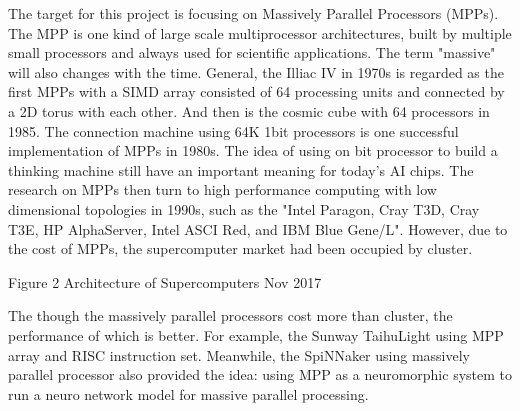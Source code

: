 \par The target for this project is focusing on Massively Parallel Processors (MPPs). The MPP is one kind of large scale multiprocessor architectures, built by multiple small processors and always used for scientific applications.\cite{hennessy2017computer} The term "massive" will also changes with the time. General, the Illiac IV in 1970s is regarded as the first MPPs with a SIMD array consisted of 64 processing units and connected by a 2D torus with each other\cite{hennessy2017computer}. And then is the cosmic cube\cite{seitz1985cosmic} with 64 processors in 1985. The connection machine\cite{Hillis1985The}\cite{leiserson1992network} using 64K 1bit processors is one successful implementation of MPPs in 1980s. The idea of using on bit processor to build a thinking machine still have an important meaning for today's AI chips. The research on MPPs then turn to high performance computing with low dimensional topologies in 1990s, such as the "Intel Paragon, Cray T3D, Cray T3E, HP AlphaServer, Intel ASCI Red, and IBM Blue Gene/L"\cite{hennessy2017computer}. However, due to the cost of MPPs, the supercomputer market had been occupied by cluster\cite{hennessy2017computer}\cite{top5002017supercomputer}.
 
\par Figure 2 Architecture of Supercomputers Nov 2017\cite{top5002017supercomputer}
\par The though the massively parallel processors cost more than cluster, the performance of which is better. For example, the Sunway TaihuLight using MPP array and RISC instruction set. Meanwhile, the SpiNNaker\cite{furber2013overview}\cite{furber2014spinnaker} using massively parallel processor also provided the idea: using MPP as a neuromorphic system to run a neuro network model for massive parallel processing. 
